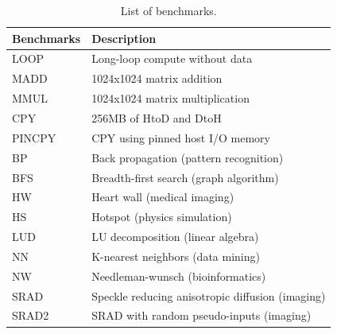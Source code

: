 \begin{table}[t]
 \caption{List of benchmarks.}
 \label{tab:benchmarks}
 \begin{center}
  {\footnotesize
  \begin{tabular}{|l|l|}
   \hline
   \textbf{Benchmarks} & \textbf{Description}\\
   \hline
   LOOP & Long-loop compute without data \\
   \hline
   MADD & 1024x1024 matrix addition\\
   \hline
   MMUL & 1024x1024 matrix multiplication\\
   \hline
   CPY & 256MB of HtoD and DtoH\\
   \hline
   PINCPY & CPY using pinned host I/O memory\\
   \hline
   BP & Back propagation (pattern recognition)\\
   \hline
   BFS & Breadth-first search (graph algorithm)\\
   \hline
   HW & Heart wall (medical imaging)\\
   \hline
   HS & Hotspot (physics simulation)\\
   \hline
   LUD & LU decomposition (linear algebra)\\
   \hline
   NN & K-nearest neighbors (data mining)\\
   \hline
   NW & Needleman-wunsch (bioinformatics)\\
   \hline
   SRAD & Speckle reducing anisotropic diffusion (imaging)\\
   \hline
   SRAD2 & SRAD with random pseudo-inputs (imaging)\\
   \hline
  \end{tabular}
  }
 \end{center}
\vspace{-1.5em}
\end{table}

